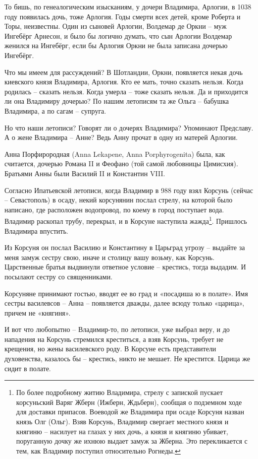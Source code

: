 То бишь, по генеалогическим изысканиям, у дочери Владимира, Арлогии, в 1038 году появилась дочь, тоже Арлогия. Годы смерти всех детей, кроме Роберта и Торы, неизвестны. Один из сыновей Арлогии, Волдемар де Оркни – муж Ингебёрг Арнесон, и было бы логично думать, что сын Арлогии Волдемар женился на Ингебёрг, если бы Арлогия Оркни не была записана дочерью Ингебёрг.  

Что мы имеем для рассуждений? В Шотландии, Оркни, появляется некая дочь киевского князя Владимира, Арлогия. Кто ее мать, точно сказать нельзя. Когда родилась – сказать нельзя. Когда умерла – тоже сказать нельзя. Да и приходится ли она Владимиру дочерью? По нашим летописям та же Ольга – бабушка Владимира, а по сагам – супруга.

Но что наши летописи? Говорят ли о дочерях Владимира? Упоминают Предславу. А о жене Владимира – Анне? Ведь Анну прочат в одну из матерей Арлогии.

Анна Порфирородная (Anna Lekapene, Anna Porphyro\-genita) была, как считается, дочерью Романа II и Феофано (той самой любовницы Цимисхия). Братьями Анны были Василий II и Константин VIII. 

Согласно Ипатьевской летописи, когда Владимир в 988 году взял Корсунь (сейчас – Севастополь) в осаду, некий корсунянин послал стрелу, на которой было написано, где расположен водопровод, по коему в город поступает вода. Владимир раскопал трубу, перекрыл, и в Корсуне наступила жажда\footnote{По более подробному житию Владимира, стрелу с запиской пускает корсуньский Варяг Жберн (Ижберн, Ждьберн), сообщая о подземном ходе для доставки припасов. Воеводой же Владимира при осаде Корсуня назван князь Олг (Ольг). Взяв Корсунь, Владимир свергает местного князя и княгиню – насилует на глазах у них дочь, а князя и княгиню убивает, поруганную дочку же ихнюю выдает замуж за Жберна. Это перекликается с тем, как Владимир поступил относительно Рогнеды.}. Пришлось Владимира впустить. 

Из Корсуня он послал Василию и Константину в Царьград угрозу – выдайте за меня замуж сестру свою, иначе и столицу вашу возьму, как Корсунь. Царственные братья выдвинули ответное условие – крестись, тогда выдадим. И посылают сестру со священниками.

Корсуняне принимают гостью, вводят ее во град и «посадиша ю в полате». Имя сестры василевсов – Анна – появляется дважды, далее всюду только «царица», причем не «княгиня».
 
И вот что любопытно – Владимир-то, по летописи, уже выбрал веру, и до нападения на Корсунь стремился креститься, а взяв Корсунь, требует не крещения, но жены василевского роду. В Корсуне есть представители духовенства, казалось бы – крестись, никто не мешает. Не крестится. Царица же сидит в полате.

